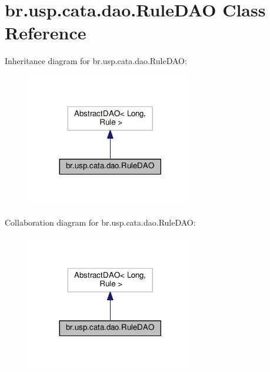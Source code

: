 \hypertarget{classbr_1_1usp_1_1cata_1_1dao_1_1_rule_d_a_o}{\section{br.\+usp.\+cata.\+dao.\+Rule\+D\+A\+O Class Reference}
\label{classbr_1_1usp_1_1cata_1_1dao_1_1_rule_d_a_o}
}


Inheritance diagram for br.\+usp.\+cata.\+dao.\+Rule\+D\+A\+O\+:\nopagebreak
\begin{figure}[H]
\begin{center}
\leavevmode
\includegraphics[width=209pt]{classbr_1_1usp_1_1cata_1_1dao_1_1_rule_d_a_o__inherit__graph}
\end{center}
\end{figure}


Collaboration diagram for br.\+usp.\+cata.\+dao.\+Rule\+D\+A\+O\+:\nopagebreak
\begin{figure}[H]
\begin{center}
\leavevmode
\includegraphics[width=209pt]{classbr_1_1usp_1_1cata_1_1dao_1_1_rule_d_a_o__coll__graph}
\end{center}
\end{figure}
